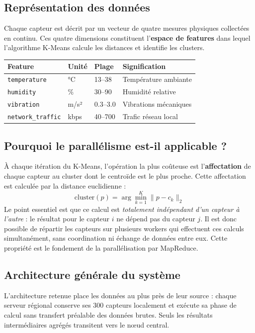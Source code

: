\documentclass[12pt,a4paper]{article}
\begin{document}
\subsection{Représentation des données}

Chaque capteur est décrit par un vecteur de quatre mesures physiques collectées en
continu. Ces quatre dimensions constituent l'\textbf{espace de features} dans lequel
l'algorithme K-Means calcule les distances et identifie les clusters.

\begin{center}
\begin{tabular}{llll}
\toprule
\textbf{Feature} & \textbf{Unité} & \textbf{Plage} & \textbf{Signification} \\
\midrule
\texttt{temperature}      & °C    & 13–38  & Température ambiante \\
\texttt{humidity}         & \%    & 30–90  & Humidité relative \\
\texttt{vibration}        & m/s²  & 0.3–3.0 & Vibrations mécaniques \\
\texttt{network\_traffic} & kbps  & 40–700 & Trafic réseau local \\
\bottomrule
\end{tabular}
\end{center}

\subsection{Pourquoi le parallélisme est-il applicable ?}

À chaque itération du K-Means, l'opération la plus coûteuse est l'\textbf{affectation}
de chaque capteur au cluster dont le centroïde est le plus proche. Cette affectation
est calculée par la distance euclidienne :
\[
  \text{cluster}(p) = \arg\min_{k=1}^{K} \| p - c_k \|_2
\]
Le point essentiel est que ce calcul est \emph{totalement indépendant d'un capteur
à l'autre} : le résultat pour le capteur $i$ ne dépend pas du capteur $j$.
Il est donc possible de répartir les capteurs sur plusieurs workers qui effectuent
ces calculs simultanément, sans coordination ni échange de données entre eux.
Cette propriété est le fondement de la parallélisation par MapReduce.

\subsection{Architecture générale du système}

L'architecture retenue place les données au plus près de leur source : chaque serveur
régional conserve ses 300 capteurs localement et exécute sa phase de calcul sans
transfert préalable des données brutes. Seuls les résultats intermédiaires agrégés
transitent vers le nœud central.
\end{document}
